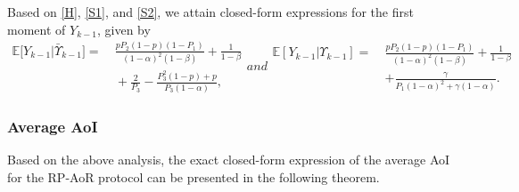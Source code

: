 \documentclass{IEEEtran}
\begin{document}
Based on \eqref{H}, \eqref{S1}, and \eqref{S2}, we attain closed-form expressions for the first moment of $Y_{k-1}$, given by
\begin{subequations} \label{Y}
			\begin{equation}
				\begin{aligned}
					\mathbb{E}\big[Y_{k-1}|\bar{\Upsilon}_{k-1}\big]=\ &\frac{pP_2(1-p)(1-P_1)}{(1-\alpha)^2(1-\beta)}+\frac{1}{1-\beta}\\
					&\!+\frac{2}{P_3}-\frac{P_3^2(1-p)+p}{P_3(1-\alpha)},
				\end{aligned}
	\end{equation}
	and
			\begin{equation}
			\begin{aligned}
			\mathbb{E}[Y_{k-1}|\Upsilon_{k-1}]=\ &\frac{pP_2(1-p)(1-P_1)}{(1-\alpha)^2(1-\beta)}+\frac{1}{1-\beta}\\
			&+\frac{\gamma}{P_1(1-\alpha)^2+\gamma(1-\alpha)}.
			\end{aligned}
	\end{equation}
\end{subequations}

\subsubsection{Average AoI}

Based on the above analysis, the exact closed-form expression of the average AoI for the RP-AoR protocol can be presented in the following theorem.
\end{document}
